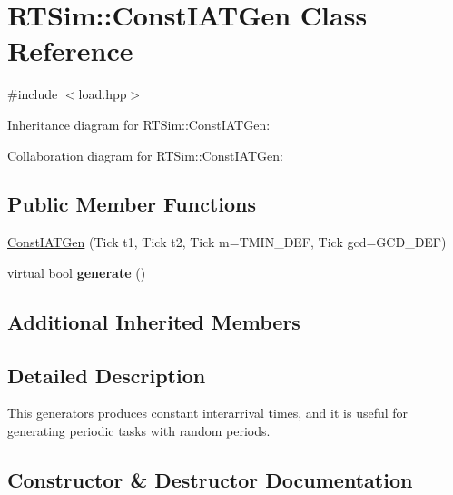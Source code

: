 \hypertarget{classRTSim_1_1ConstIATGen}{}\section{R\+T\+Sim\+:\+:Const\+I\+A\+T\+Gen Class Reference}
\label{classRTSim_1_1ConstIATGen}


{\ttfamily \#include $<$load.\+hpp$>$}



Inheritance diagram for R\+T\+Sim\+:\+:Const\+I\+A\+T\+Gen\+:


Collaboration diagram for R\+T\+Sim\+:\+:Const\+I\+A\+T\+Gen\+:
\subsection*{Public Member Functions}
\begin{DoxyCompactItemize}
\item 
\hyperlink{classRTSim_1_1ConstIATGen_af6e3fccd2b724dd876e3d179f639e1ad}{Const\+I\+A\+T\+Gen} (Tick t1, Tick t2, Tick m=T\+M\+I\+N\+\_\+\+D\+EF, Tick gcd=G\+C\+D\+\_\+\+D\+EF)
\item 
virtual bool {\bfseries generate} ()\hypertarget{classRTSim_1_1ConstIATGen_acd4f8abb9e277f97463a913af538cd3a}{}\label{classRTSim_1_1ConstIATGen_acd4f8abb9e277f97463a913af538cd3a}

\end{DoxyCompactItemize}
\subsection*{Additional Inherited Members}


\subsection{Detailed Description}
This generators produces constant interarrival times, and it is useful for generating periodic tasks with random periods. 

\subsection{Constructor \& Destructor Documentation}

